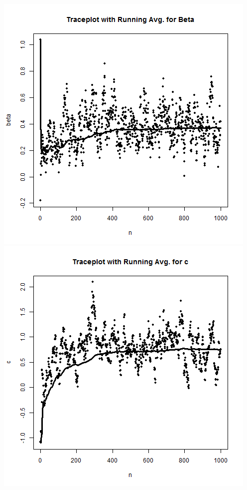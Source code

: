 \documentclass{article}
\begin{document}
\begin{enumerate}
\begin{enumerate}
\includegraphics[scale=0.4]{mixb1.png}
\includegraphics[scale=0.4]{mixc1.png} \\


\end{enumerate}
\end{enumerate}
\end{document}
